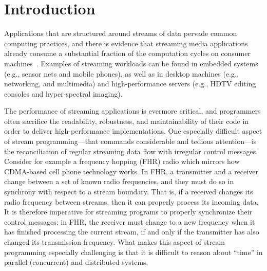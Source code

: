 \section{Introduction}


Applications that are structured around streams of data pervade common
computing  practices,  and  there  is evidence  that  streaming  media
applications already consume a substantial fraction of the computation
cycles    on    consumer   machines~\cite{rixner98bandwidthefficient}.
Examples  of streaming  workloads  can be  found  in embedded  systems
(e.g., sensor nets and mobile  phones), as well as in desktop machines
(e.g., networking, and  multimedia) and high-performance servers (e.g.,
HDTV editing consoles and hyper-spectral imaging). 

The performance  of streaming  applications is evermore  critical, and
programmers   often  sacrifice   the   readability,  robustness,   and
maintainability  of their  code in  order to  deliver high-performance
implementations.    One   especially   difficult  aspect   of   stream
programming---that  commands considerable  and  tedious attention---is
the  reconciliation  of regular  streaming  data  flow with  irregular
control messages. Consider for example a frequency hopping (FHR) radio
which mirrors how  CDMA-based cell phone technology works.   In FHR, a
transmitter  and  a receiver  change  between  a  set of  known  radio
frequencies, and they must do so in synchrony with respect to a stream
boundary. That is,  if a received changes its  radio frequency between
streams,  then it  can  properly  process its  incoming  data.  It  is
therefore imperative  for streaming programs  to properly synchronize
their  control messages; in  FHR, the  receiver must  change to  a new
frequency when it  has finished processing the current  stream, if and
only if  the transmitter has also changed  its transmission frequency.
What makes this aspect of stream programming especially challenging is
that it is difficult to reason about ``time'' in parallel (concurrent)
and distributed systems.


